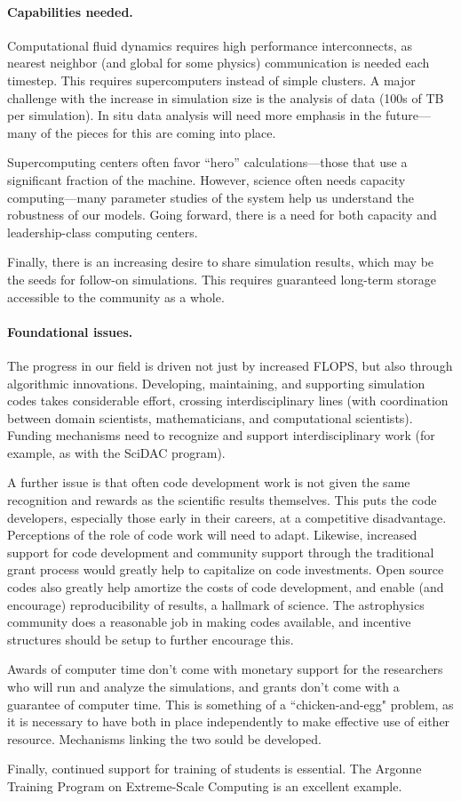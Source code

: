 \documentclass[11pt,twocolumn]{article}
\begin{document}
\paragraph*{Capabilities needed.}  Computational fluid dynamics requires
high performance interconnects, as nearest neighbor (and global for
some physics) communication is needed each timestep.  This requires
supercomputers instead of simple clusters.  A major challenge with the
increase in simulation size is the analysis of data (100s of TB
per simulation).  In situ data analysis will need more emphasis in the
future---many of the pieces for this are coming into place.

Supercomputing centers often favor ``hero'' calculations---those that
use a significant fraction of the machine.
However, science often needs capacity computing---many parameter
studies of the system help us understand the robustness of our models.
Going forward, there is a need for both capacity and leadership-class
computing centers.

Finally, there is an increasing desire to share simulation results,
which may be the seeds for follow-on simulations.  This
requires guaranteed long-term storage accessible to the community as a
whole.

\paragraph*{Foundational issues.}

The progress in our field is driven not just by increased FLOPS, but
also through algorithmic innovations.  Developing, maintaining, and
supporting simulation codes takes considerable effort, crossing
interdisciplinary lines (with coordination between domain scientists,
mathematicians, and computational scientists).  Funding mechanisms
need to recognize and support interdisciplinary work (for
example, as with the SciDAC program).

A further issue is that
often code development work is not given the same recognition and
rewards as the scientific results themselves.  This puts the code
developers, especially those early in their careers, at a competitive
disadvantage.  Perceptions of the role of code work will need to
adapt.  Likewise, increased support for code development and community
support through the traditional grant process would greatly help to
capitalize on code investments.  Open source codes also greatly help
amortize the costs of code development, and enable (and encourage)
reproducibility of results, a hallmark of science.  The astrophysics
community does a reasonable job in making codes available, and
incentive structures should be setup to further encourage this.

Awards of computer time don't come with monetary support for the
researchers who will run and analyze the simulations, and grants don't
come with a guarantee of computer time.  This is something of a
``chicken-and-egg" problem, as it is necessary to have both in place
independently to make effective use of either resource.  Mechanisms
linking the two sould be developed.

Finally, continued support for training of students is essential. The
Argonne Training Program on Extreme-Scale Computing is an excellent
example.
\end{document}

